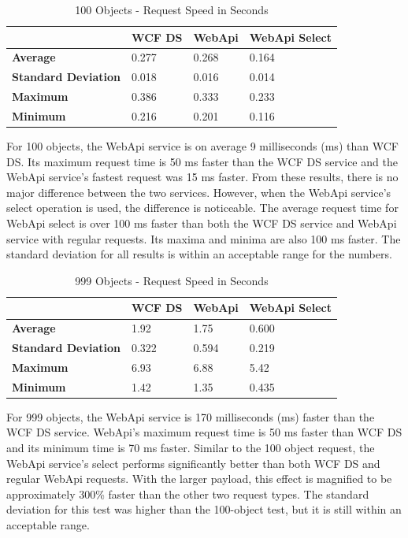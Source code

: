 \documentclass[se]{uw-wkrpt}
\begin{document}
\begin{table}
  \caption{100 Objects - Request Speed in Seconds}
  \label{tbl:100speed}
  \centering
    \begin{tabular}{ | l | l | l | p{5cm} |}
    \hline
     & \textbf{WCF DS} &  \textbf{WebApi} & \textbf{WebApi Select} \\ \hline
    \textbf{Average} & 0.277 & 0.268 & 0.164 \\ \hline
    \textbf{Standard Deviation} & 0.018 & 0.016 & 0.014 \\ \hline
    \textbf{Maximum} & 0.386 & 0.333 & 0.233 \\ \hline
     \textbf{Minimum} & 0.216 & 0.201 & 0.116 \\
    \hline
    \end{tabular}
\end{table}

For 100 objects, the WebApi service is on average 9 milliseconds (ms) than WCF DS. Its maximum request time is 50 ms faster than the WCF DS service and the WebApi service's fastest request was 15 ms faster. From these results, there is no major difference between the two services. However, when the WebApi service's select operation is used, the difference is noticeable. The average request time for WebApi select is over 100 ms faster than both the WCF DS service and WebApi service with regular requests. Its maxima and minima are also 100 ms faster. The standard deviation for all results is within an acceptable range for the numbers.

\begin{table}
  \caption{999 Objects - Request Speed in Seconds}
  \label{tbl:999speed}
  \centering
    \begin{tabular}{ | l | l | l | p{5cm} |}
    \hline
     & \textbf{WCF DS} &  \textbf{WebApi} & \textbf{WebApi Select} \\ \hline
    \textbf{Average} & 1.92 & 1.75 & 0.600 \\ \hline
    \textbf{Standard Deviation} & 0.322 & 0.594 & 0.219 \\ \hline
    \textbf{Maximum} & 6.93 & 6.88 & 5.42 \\ \hline
     \textbf{Minimum} & 1.42 & 1.35 & 0.435 \\
    \hline
    \end{tabular}
\end{table}

For 999 objects, the WebApi service is 170 milliseconds (ms) faster than the WCF DS service. WebApi's maximum request time is 50 ms faster than WCF DS and its minimum time is 70 ms faster. Similar to the 100 object request, the WebApi service's select performs significantly better than both WCF DS and regular WebApi requests. With the larger payload, this effect is magnified to be approximately 300\% faster than the other two request types. The standard deviation for this test was higher than the 100-object test, but it is still within an acceptable range.
\end{document}
